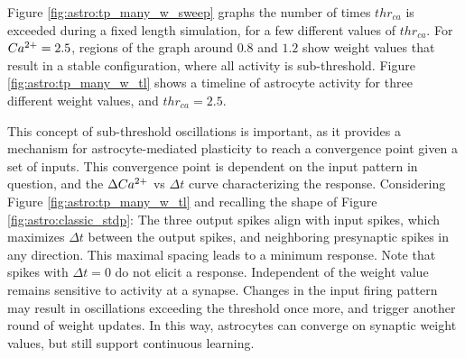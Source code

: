 
Figure \ref{fig:astro:tp_many_w_sweep} graphs the number of times $thr_{ca}$ is
exceeded during a fixed length simulation, for a few different values of
$thr_{ca}$. For $Ca^{2+}=2.5$, regions of the graph around $0.8$ and $1.2$ show
weight values that result in a stable configuration, where all \ca activity is
sub-threshold. Figure \ref{fig:astro:tp_many_w_tl} shows
a timeline of astrocyte activity for three different weight values, and
$thr_{ca}=2.5$.



This concept of sub-threshold oscillations is important, as it provides a
mechanism for astrocyte-mediated plasticity to reach a convergence point given a
set of inputs. This convergence point is dependent on the input pattern in
question, and the $\Delta Ca^{2+}$ vs $\Delta t$ curve characterizing the \ca
response. Considering Figure \ref{fig:astro:tp_many_w_tl} and recalling the
shape of Figure \ref{fig:astro:classic_stdp}: The three output spikes align with
input spikes, which maximizes $\Delta t$ between the output spikes, and
neighboring presynaptic spikes in any direction. This maximal spacing leads to a
minimum \ca response. Note that spikes with $\Delta t=0$ do not elicit a \ca
response. Independent of the weight value \ca remains sensitive to activity at a
synapse. Changes in the input firing pattern may result in \ca oscillations
exceeding the threshold once more, and trigger another round of weight
updates. In this way, astrocytes can converge on synaptic weight values, but
still support continuous learning.


